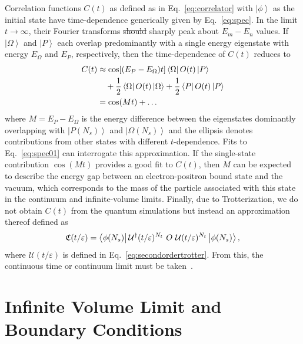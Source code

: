 \documentclass[twocolumn,superscriptaddress,showpacs,nofootinbib,notitlepage,preprintnumbers,secnumarabic,amssymb, floatfix, nobibnotes, aps, prd]{revtex4-2}
\newcommand{\ket}[1]{\left| #1 \right>} %
\newcommand{\mbraket}[3]{\left< #1 \vphantom{#2#3} \right|
 #2 \left| #3 \vphantom{#1#2} \right>} %
\begin{document}
Correlation functions $C(t)$ as defined as in Eq.~\eqref{eq:correlator} with $\ket{\phi}$ as the initial state have time-dependence generically given by Eq.~\eqref{eq:spec}. 
In the limit $t\rightarrow\infty$, their Fourier transforms {\color{red}\st{should}} sharply peak about $E_m-E_n$ values.
If $\ket{\Omega}$ and $\ket{P}$ each overlap predominantly with a single energy eigenstate with energy $E_{\Omega}$ and $E_P$, respectively, then the time-dependence of $C(t)$ reduces to  
\begin{equation}
\begin{split}
  C(t)&\approx \cos[(E_P-E_{\Omega})t] \mbraket{\Omega}{O(t)}{P}\\
  &\hspace{10pt} + \frac{1}{2} \mbraket{\Omega}{O(t)}{\Omega} + \frac{1}{2} \mbraket{P}{O(t)}{P} \\
  &=\cos(M t)+\hdots \label{eq:spec01}
\end{split}
\end{equation}
where $M=E_P-E_{\Omega}$ is the energy difference between the eigenstates dominantly overlapping with $\ket{P(N_s)}$ and $\ket{\Omega(N_s)}$ and the ellipsis denotes contributions from other states with different $t$-dependence. 
Fits to Eq.~\eqref{eq:spec01} can interrogate this approximation.
If the single-state contribution $\cos(Mt)$ provides a good fit to $C(t)$, then $M$ can be expected to describe the energy gap between an electron-positron bound state and the vacuum, which corresponds to the mass of the particle associated with this state in the continuum and infinite-volume limits.
Finally, due to Trotterization, we do not obtain $C(t)$ from the quantum simulations but instead an approximation thereof defined as
\begin{equation}
    \label{eq:simobservable}
    \mathfrak{C}(t/\varepsilon) = \mbraket{ \phi(N_s) }{ \mathcal{U}^{\dagger}(t/\varepsilon)^{N_t} \ O \  \mathcal{U}(t/\varepsilon)^{N_t} }{ \phi(N_s) },
\end{equation}
where $\mathcal{U}(t/\varepsilon)$ is defined in Eq.~\eqref{eq:secondordertrotter}.  From this, the continuous time or continuum limit must be taken~\cite{Carena:2021ltu}.

\section{Infinite Volume Limit and Boundary Conditions}
\label{sec:infvolbc}
\end{document}
